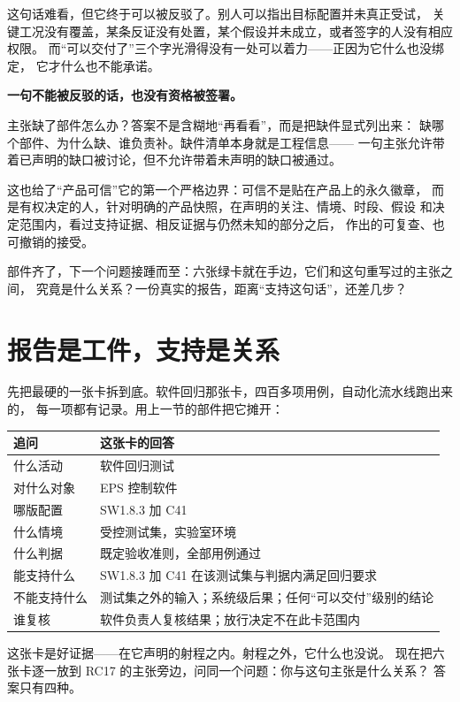 这句话难看，但它终于可以被反驳了。别人可以指出目标配置并未真正受试，
关键工况没有覆盖，某条反证没有处置，某个假设并未成立，或者签字的人没有相应权限。
而“可以交付了”三个字光滑得没有一处可以着力——正因为它什么也没绑定，
它才什么也不能承诺。

\textbf{一句不能被反驳的话，也没有资格被签署。}

主张缺了部件怎么办？答案不是含糊地“再看看”，而是把缺件显式列出来：
缺哪个部件、为什么缺、谁负责补。缺件清单本身就是工程信息——
一句主张允许带着已声明的缺口被讨论，但不允许带着未声明的缺口被通过。

这也给了“产品可信”它的第一个严格边界：可信不是贴在产品上的永久徽章，
而是有权决定的人，针对明确的产品快照，在声明的关注、情境、时段、假设
和决定范围内，看过支持证据、相反证据与仍然未知的部分之后，
作出的可复查、也可撤销的接受。

部件齐了，下一个问题接踵而至：六张绿卡就在手边，它们和这句重写过的主张之间，
究竟是什么关系？一份真实的报告，距离“支持这句话”，还差几步？

\section{报告是工件，支持是关系}

先把最硬的一张卡拆到底。软件回归那张卡，四百多项用例，自动化流水线跑出来的，
每一项都有记录。用上一节的部件把它摊开：

\begin{center}
\begingroup\small
\setlength{\tabcolsep}{4pt}
\begin{tabularx}{\linewidth}{@{}XX@{}}
\toprule
追问 & 这张卡的回答 \\
\midrule
什么活动 & 软件回归测试 \\
对什么对象 & EPS 控制软件 \\
哪版配置 & SW1.8.3 加 C41 \\
什么情境 & 受控测试集，实验室环境 \\
什么判据 & 既定验收准则，全部用例通过 \\
能支持什么 & SW1.8.3 加 C41 在该测试集与判据内满足回归要求 \\
不能支持什么 & 测试集之外的输入；系统级后果；任何“可以交付”级别的结论 \\
谁复核 & 软件负责人复核结果；放行决定不在此卡范围内 \\
\bottomrule
\end{tabularx}
\endgroup
\end{center}

这张卡是好证据——在它声明的射程之内。射程之外，它什么也没说。
现在把六张卡逐一放到 RC17 的主张旁边，问同一个问题：你与这句主张是什么关系？
答案只有四种。

